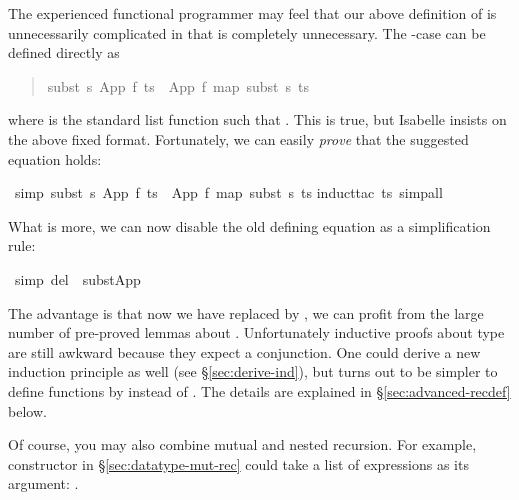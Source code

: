 \begin{isabellebody}
\begin{isamarkuptext}
The experienced functional programmer may feel that our above definition of
 is unnecessarily complicated in that  is completely
unnecessary. The -case can be defined directly as
\begin{quote}

\begin{isabelle}%
subst\ \mbox{s}\ {\isacharparenleft}App\ \mbox{f}\ \mbox{ts}{\isacharparenright}\ {\isacharequal}\ App\ \mbox{f}\ {\isacharparenleft}map\ {\isacharparenleft}subst\ \mbox{s}{\isacharparenright}\ \mbox{ts}{\isacharparenright}
\end{isabelle}%

\end{quote}
where  is the standard list function such that
. This is true, but Isabelle insists
on the above fixed format. Fortunately, we can easily \emph{prove} that the
suggested equation holds:%
\end{isamarkuptext}%
\ {\isacharbrackleft}simp{\isacharbrackright}{\isacharcolon}\ {\isachardoublequote}subst\ s\ {\isacharparenleft}App\ f\ ts{\isacharparenright}\ {\isacharequal}\ App\ f\ {\isacharparenleft}map\ {\isacharparenleft}subst\ s{\isacharparenright}\ ts{\isacharparenright}{\isachardoublequote}\isanewline
{}induct{\isacharunderscore}tac\ ts{\isacharcomma}\ simp{\isacharunderscore}all{\isacharparenright}%
\begin{isamarkuptext}%
\noindent
What is more, we can now disable the old defining equation as a
simplification rule:%
\end{isamarkuptext}%
\ {\isacharbrackleft}simp\ del{\isacharbrackright}\ {\isacharequal}\ subst{\isacharunderscore}App%
\begin{isamarkuptext}%
\noindent
The advantage is that now we have replaced  by
, we can profit from the large number of pre-proved lemmas
about .  Unfortunately inductive proofs about type
 are still awkward because they expect a conjunction. One
could derive a new induction principle as well (see
\S\ref{sec:derive-ind}), but turns out to be simpler to define
functions by  instead of .
The details are explained in \S\ref{sec:advanced-recdef} below.

Of course, you may also combine mutual and nested recursion. For example,
constructor  in \S\ref{sec:datatype-mut-rec} could take a list of
expressions as its argument: .%
\end{isamarkuptext}%
\end{isabellebody}%
